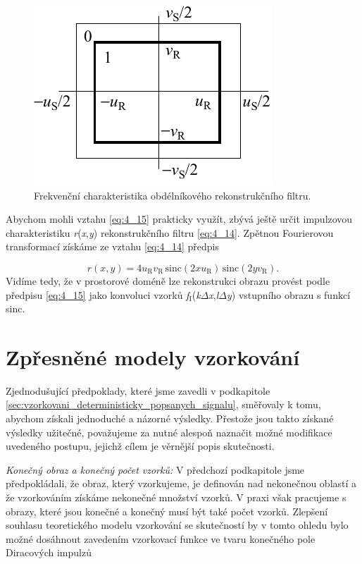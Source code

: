 \begin{figure}[th]
    \begin{center}
        \includegraphics[scale=1.0]{04_digitalizace/images/img_4_3.pdf}
    \end{center}
    \caption{Frekvenční charakteristika obdélníkového rekonstrukčního filtru.}
    \label{img:4_3}
\end{figure}

Abychom mohli vztahu \eqref{eq:4_15} prakticky využít, zbývá ještě určit impulzovou charakteristiku \textit{r}(\textit{x},\textit{y}) rekonstrukčního filtru \eqref{eq:4_14}. Zpětnou Fourierovou transformací získáme ze vztahu \eqref{eq:4_14} předpis

\begin{equation} \label{eq:4_16}
    r(x, y) = 4 u_\mathrm{R} v_\mathrm{R} \, \mathrm{sinc} (2 x u_\mathrm{R}) \, \mathrm{sinc} (2 y v_\mathrm{R}).
\end{equation}
Vidíme tedy, že v prostorové doméně lze rekonstrukci obrazu provést podle předpisu \eqref{eq:4_15} jako konvoluci vzorků \textit{f}$_\mathrm{I}$(\textit{k}$\Delta$\textit{x},\textit{l}$\Delta$\textit{y}) vstupního obrazu s funkcí \textrm{sinc}.

\section*{Zpřesněné modely vzorkování}

Zjednodušující předpoklady, které jsme zavedli v podkapitole \ref{sec:vzorkovani_deterministicky_popsanych_signalu}, směřovaly k tomu, abychom získali jednoduché a názorné výsledky. Přestože jsou takto získané výsledky užitečné, považujeme za nutné alespoň naznačit možné modifikace uvedeného postupu, jejichž cílem je věrnější popis skutečnosti.

\noindent \textit{Konečný obraz a konečný počet vzorků:} V předchozí podkapitole jsme předpokládali, že obraz, který vzorkujeme, je definován nad nekonečnou oblastí a že vzorkováním získáme nekonečné množství vzorků. V praxi však pracujeme s obrazy, které jsou konečné a konečný musí být také počet vzorků. Zlepšení souhlasu teoretického modelu vzorkování se skutečností by v tomto ohledu bylo možné dosáhnout zavedením vzorkovací funkce ve tvaru konečného pole Diracových impulzů

